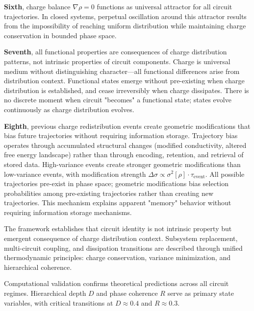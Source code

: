 \documentclass[12pt,a4paper]{article}
\theoremstyle{plain}
\theoremstyle{definition}
\theoremstyle{remark}
\begin{document}
\textbf{Sixth}, charge balance $\nabla \rho = 0$ functions as universal attractor for all circuit trajectories. In closed systems, perpetual oscillation around this attractor results from the impossibility of reaching uniform distribution while maintaining charge conservation in bounded phase space.

\textbf{Seventh}, all functional properties are consequences of charge distribution patterns, not intrinsic properties of circuit components. Charge is universal medium without distinguishing character—all functional differences arise from distribution context. Functional states emerge without pre-existing when charge distribution is established, and cease irreversibly when charge dissipates. There is no discrete moment when circuit "becomes" a functional state; states evolve continuously as charge distribution evolves.

\textbf{Eighth}, previous charge redistribution events create geometric modifications that bias future trajectories without requiring information storage. Trajectory bias operates through accumulated structural changes (modified conductivity, altered free energy landscape) rather than through encoding, retention, and retrieval of stored data. High-variance events create stronger geometric modifications than low-variance events, with modification strength $\Delta \sigma \propto \sigma^2[\rho] \cdot \tau_{\text{event}}$. All possible trajectories pre-exist in phase space; geometric modifications bias selection probabilities among pre-existing trajectories rather than creating new trajectories. This mechanism explains apparent "memory" behavior without requiring information storage mechanisms.

The framework establishes that circuit identity is not intrinsic property but emergent consequence of charge distribution context. Subsystem replacement, multi-circuit coupling, and dissipation transitions are described through unified thermodynamic principles: charge conservation, variance minimization, and hierarchical coherence.

Computational validation confirms theoretical predictions across all circuit regimes. Hierarchical depth $D$ and phase coherence $R$ serve as primary state variables, with critical transitions at $D \approx 0.4$ and $R \approx 0.3$.



\end{document}

